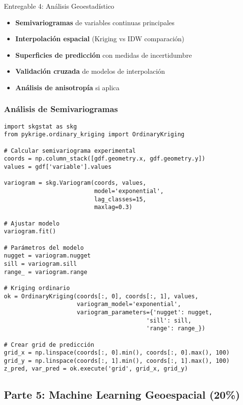 \documentclass[12pt,a4paper]{article}
\begin{document}
\begin{deliverable}{Entregable 4: Análisis Geoestadístico}
\begin{itemize}
    \item \textbf{Semivariogramas} de variables continuas principales
    \item \textbf{Interpolación espacial} (Kriging vs IDW comparación)
    \item \textbf{Superficies de predicción} con medidas de incertidumbre
    \item \textbf{Validación cruzada} de modelos de interpolación
    \item \textbf{Análisis de anisotropía} si aplica
\end{itemize}
\end{deliverable}

\subsubsection{Análisis de Semivariogramas}

\begin{verbatim}
import skgstat as skg
from pykrige.ordinary_kriging import OrdinaryKriging

# Calcular semivariograma experimental
coords = np.column_stack([gdf.geometry.x, gdf.geometry.y])
values = gdf['variable'].values

variogram = skg.Variogram(coords, values,
                          model='exponential',
                          lag_classes=15,
                          maxlag=0.3)

# Ajustar modelo
variogram.fit()

# Parámetros del modelo
nugget = variogram.nugget
sill = variogram.sill
range_ = variogram.range

# Kriging ordinario
ok = OrdinaryKriging(coords[:, 0], coords[:, 1], values,
                     variogram_model='exponential',
                     variogram_parameters={'nugget': nugget,
                                         'sill': sill,
                                         'range': range_})

# Crear grid de predicción
grid_x = np.linspace(coords[:, 0].min(), coords[:, 0].max(), 100)
grid_y = np.linspace(coords[:, 1].min(), coords[:, 1].max(), 100)
z_pred, var_pred = ok.execute('grid', grid_x, grid_y)
\end{verbatim}

\subsection{Parte 5: Machine Learning Geoespacial (20\%)}
\end{document}
